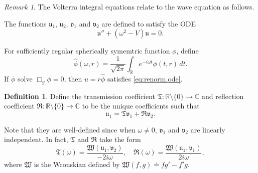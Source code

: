 \documentclass[10pt, reqno]{amsart}
\theoremstyle{definition}
\newtheorem{definition}[theorem]{Definition}
\theoremstyle{remark}
\newtheorem{remark}[theorem]{Remark}
\numberwithin{equation}{section}
\newcommand{\0}{\emptyset}
\newcommand{\om}{\omega}
\newcommand{\f}{\frac}
\begin{document}
\begin{remark}
The Volterra integral equations relate to the wave equation as follows.

The functions $\mathfrak u_1$, $\mathfrak u_2$, $\mathfrak v_1$ and $\mathfrak v_2$ are defined to satisfy the ODE
\begin{equation}\label{eq:renorm.ode}
\mathfrak u'' + (\om^2 -V) \mathfrak u =0.
\end{equation}

For sufficiently regular spherically symemtric function $\phi$, define 
$$\hat{\phi}(\om,r) = \f 1{\sqrt{2\pi}} \int_{\mathbb R} e^{-i\om t} \phi(t,r)\, dt.$$
If $\phi$ solve $\Box_g \phi = 0$, then $u = r\hat{\phi}$ satisfies \eqref{eq:renorm.ode}.

\end{remark}

\begin{definition}
Define the transmission coefficient $\mathfrak T: \mathbb R\setminus\{0\}\to \mathbb C$ and reflection coefficient $\mathfrak R:\mathbb R \setminus\{0\}\to \mathbb C$ to be the unique coefficients such that
$$\mathfrak u_1 = \mathfrak T \mathfrak v_1 + \mathfrak R \mathfrak v_2.$$

Note that they are well-defined since when $\om\neq 0$, $\mathfrak v_1$ and $\mathfrak v_2$ are linearly independent. In fact, $\mathfrak T$ and $\mathfrak R$ take the form
$$\mathfrak T(\om) = \f{\mathfrak W(\mathfrak u_1,\mathfrak v_2)}{-2i\om},\quad \mathfrak R(\om) = \f{\mathfrak W(\mathfrak u_1,\mathfrak v_1)}{2i\om},$$
where $\mathfrak W$ is the Wronskian defined by $\mathfrak W(f,g) \doteq  fg'-f'g$.
\end{definition}
\end{document}
